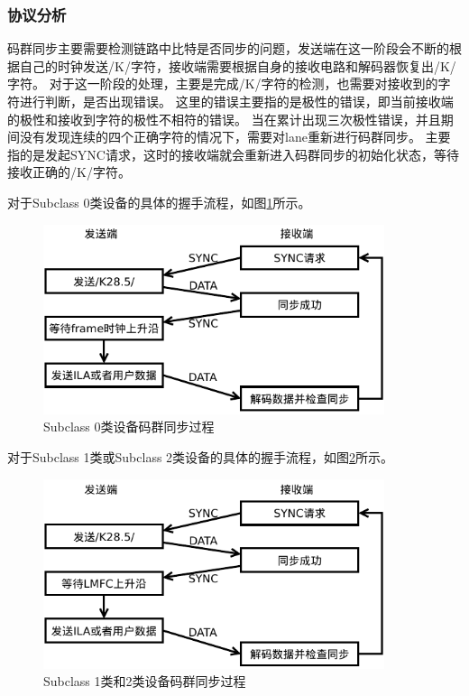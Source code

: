 \documentclass[UTF8]{ctexart}
\begin{document}
\subsubsection{协议分析}

码群同步主要需要检测链路中比特是否同步的问题，发送端在这一阶段会不断的根据自己的时钟发送/K/字符，接收端需要根据自身的接收电路和解码器恢复出/K/字符。
对于这一阶段的处理，主要是完成/K/字符的检测，也需要对接收到的字符进行判断，是否出现错误。
这里的错误主要指的是极性的错误，即当前接收端的极性和接收到字符的极性不相符的错误。
当在累计出现三次极性错误，并且期间没有发现连续的四个正确字符的情况下，需要对lane重新进行码群同步。
主要指的是发起SYNC请求，这时的接收端就会重新进入码群同步的初始化状态，等待接收正确的/K/字符。

对于Subclass 0类设备的具体的握手流程，如图\ref{fig:cgs_subclass_0}所示。

\begin{figure}[H]
\centering
\includegraphics[width=10cm]{./img/cgs_subclass_0.pdf}
\caption{Subclass 0类设备码群同步过程}
\label{fig:cgs_subclass_0}
\end{figure}

对于Subclass 1类或Subclass 2类设备的具体的握手流程，如图\ref{fig:cgs_subclass_1_2}所示。

\begin{figure}[H]
\centering
\includegraphics[width=10cm]{./img/cgs_subclass_1_2.pdf}
\caption{Subclass 1类和2类设备码群同步过程}
\label{fig:cgs_subclass_1_2}
\end{figure}
\end{document}
